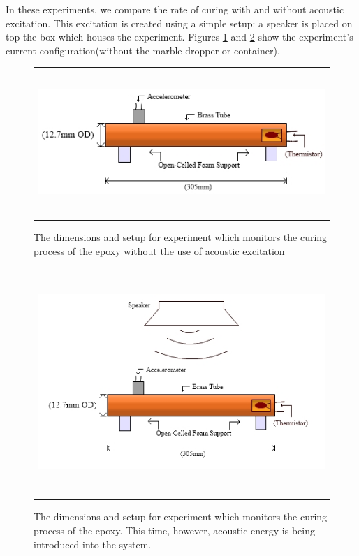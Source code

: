 \documentclass[a4paper]{spie}  %
\begin{document}
In these experiments, we compare the rate of curing with and without acoustic excitation. This excitation is created using a simple setup: a speaker is placed on top the box which houses the experiment.
Figures \ref{fig:epoxy_rod} and \ref{fig:speaker} show the experiment's current configuration(without the marble dropper or container).

\begin{figure}[h!]
\begin{center}
\begin{tabular}{c}
\includegraphics[height=5.5cm]{epoxy_rod}
 \end{tabular}
\end{center}
\caption[example] 
{ \label{fig:epoxy_rod} 
   The dimensions and setup for experiment which monitors the curing process of the epoxy without the use of acoustic excitation
   }
\end{figure} 
   
 \begin{figure}[h!]
\begin{center}
\begin{tabular}{c}
\includegraphics[height=8.5cm]{speaker}
\end{tabular}
\end{center}
\caption[example] 
{ \label{fig:speaker} 
   The dimensions and setup for experiment which monitors the curing process of the epoxy. This time, however, acoustic energy is being introduced into the system.
   }
\end{figure} 
\end{document}
